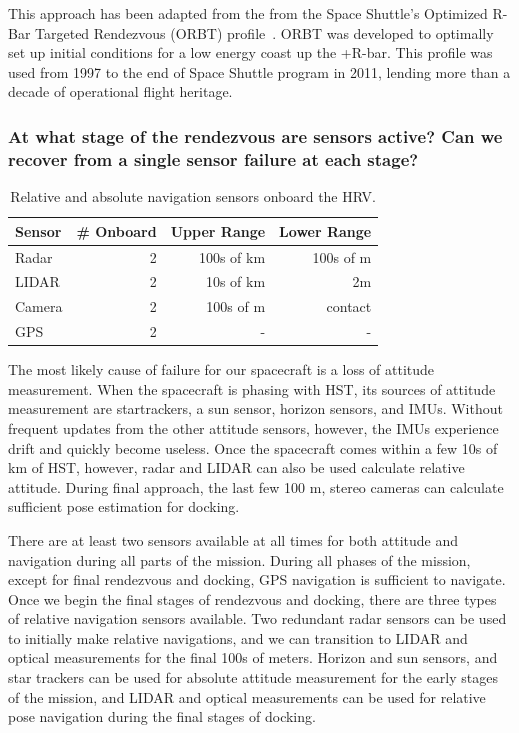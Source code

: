 \documentclass[paper=letter, fontsize=11pt]{scrartcl} %
\numberwithin{equation}{section} %
\numberwithin{figure}{section} %
\numberwithin{table}{section} %
\begin{document}
This approach has been adapted from the from the Space Shuttle's Optimized R-Bar Targeted Rendezvous (ORBT) profile~\cite{goodman2006history}. ORBT was developed to optimally set up initial conditions for a low energy coast up the +R-bar. This profile was used from 1997 to the end of Space Shuttle program in 2011, lending more than a decade of operational flight heritage.

\subsubsection{At what stage of the rendezvous are sensors active? Can we recover from a single sensor failure at each stage?}
\begin{table}[H]
    \begin{center}
        \begin{tabular}{l r r r}
            \toprule
            Sensor & \# Onboard & Upper Range & Lower Range \\
            \midrule
            Radar  & 2          & 100s of km  & 100s of m   \\
            LIDAR  & 2          & 10s of km   & 2m          \\
            Camera & 2          & 100s of m   & contact     \\
            GPS    & 2          & -           & -           \\
            \bottomrule
        \end{tabular}
    \end{center}
    \caption{Relative and absolute navigation sensors onboard the HRV.}
\end{table}

The most likely cause of failure for our spacecraft is a loss of attitude measurement. When the spacecraft is phasing with HST, its sources of attitude measurement are startrackers, a sun sensor, horizon sensors, and IMUs. Without frequent updates from the other attitude sensors, however, the IMUs experience drift and quickly become useless. Once the spacecraft comes within a few 10s of km of HST, however, radar and LIDAR can also be used calculate relative attitude. During final approach, the last few 100 m, stereo cameras can calculate sufficient pose estimation for docking.

There are at least two sensors available at all times for both attitude and navigation during all parts of the mission. During all phases of the mission, except for final rendezvous and docking, GPS navigation is sufficient to navigate. Once we begin the final stages of rendezvous and docking, there are three types of relative navigation sensors available. Two redundant radar sensors can be used to initially make relative navigations, and we can transition to LIDAR and optical measurements for the final 100s of meters. Horizon and sun sensors, and star trackers can be used for absolute attitude measurement for the early stages of the mission, and LIDAR and optical measurements can be used for relative pose navigation during the final stages of docking.
\end{document}
